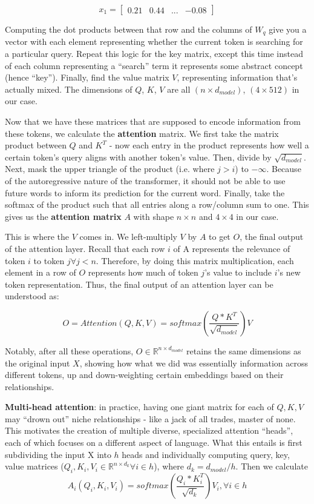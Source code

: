 \documentclass[12pt]{article}
\begin{document}
\[x_1 = \begin{bmatrix}
0.21 & 0.44 & ... & -0.08
\end{bmatrix}\]

Computing the dot products between that row and the columns of $W_q$ give you a vector with each element representing whether the current token is searching for a particular query. Repeat this logic for the key matrix, except this time instead of each column representing a \enquote{search} term it represents some abstract concept (hence \enquote{key}). Finally, find the value matrix $V$, representing information that's actually mixed. The dimensions of $Q$, $K$, $V$ are all $(n \times d_{model})$, $(4 \times 512)$ in our case.

Now that we have these matrices that are supposed to encode information from these tokens, we calculate the \textbf{attention} matrix. We first take the matrix product between $Q$ and $K^T$ - now each entry in the product represents how well a certain token's query aligns with another token's value. Then, divide by $\sqrt{d_{model}}$. Next, mask the upper triangle of the product (i.e. where $j > i$) to $-\infty$. Because of the autoregressive nature of the transformer, it should not be able to use future words to inform its prediction for the current word. Finally, take the softmax of the product such that all entries along a row/column sum to one. This gives us the \textbf{attention matrix} $A$ with shape $n \times n$ and $4 \times 4$ in our case. 

This is where the $V$ comes in. We left-multiply $V$ by $A$ to get $O$, the final output of the attention layer. Recall that each row $i$ of A represents the relevance of token $i$ to token $j \forall j<n$. Therefore, by doing this matrix multiplication, each element in a row of $O$ represents how much of token $j$'s value to include $i$'s new token representation. Thus, the final output of an attention layer can be understood as:

\[O = Attention(Q, K, V) = softmax(\frac{Q*K^T}{\sqrt{d_{model}}})V\]

Notably, after all these operations, $O \in \mathbb{R}^{n \times d_{model}}$ retains the same dimensions as the original input $X$, showing how what we did was essentially information across different tokens, up and down-weighting certain embeddings based on their relationships. 

\textbf{Multi-head attention}: in practice, having one giant matrix for each of $Q, K, V$ may \enquote{drown out} niche relationships - like a jack of all trades, master of none. This motivates the creation of multiple diverse, specialized attention \enquote{heads}, each of which focuses on a different aspect of language. What this entails is first subdividing the input X into $h$ heads and individually computing query, key, value matrices ($Q_i, K_i, V_i \in \mathbb{R}^{n \times d_{k}} \forall i \in h$), where $d_k=d_{model}/h$. Then we calculate \[A_i(Q_i, K_i, V_i)= softmax(\frac{Q_i*K_i^T}{\sqrt{d_k}})V_i, \forall i \in h\]
\end{document}
